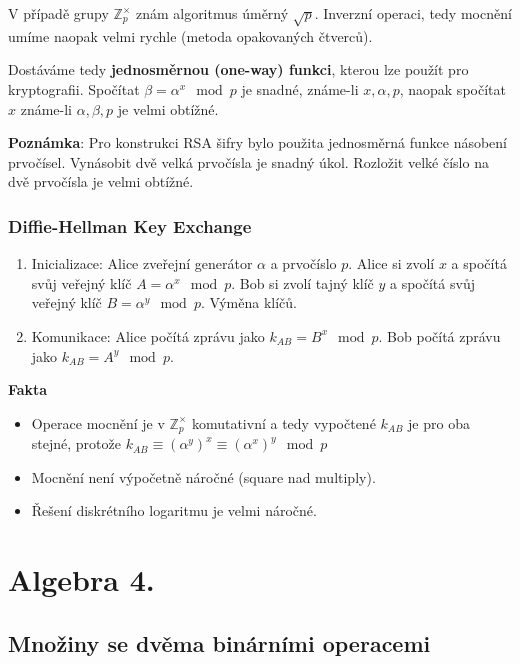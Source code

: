 \documentclass[12pt, letterpaper]{article}
\begin{document}
V případě grupy $\mathbb{Z}^\times_p$ znám algoritmus úměrný $\sqrt{p}$.
Inverzní operaci, tedy mocnění umíme naopak velmi rychle (metoda opakovaných čtverců).

Dostáváme tedy \textbf{jednosměrnou (one-way) funkci}, kterou lze použít pro kryptografii.
Spočítat $\beta = \alpha^x \mod p$ je snadné, známe-li $x, \alpha, p$,
naopak spočítat $x$ známe-li $\alpha, \beta, p$ je velmi obtížné.

\textbf{Poznámka}: Pro konstrukci RSA šifry bylo použita jednosměrná funkce násobení prvočísel.
Vynásobit dvě velká prvočísla je snadný úkol. Rozložit velké číslo na dvě prvočísla je velmi obtížné.

\subsubsection*{Diffie-Hellman Key Exchange}
\begin{enumerate}
    \item Inicializace:
    \subitem Alice zveřejní generátor $\alpha$ a prvočíslo $p$.
    \subitem Alice si zvolí $x$ a spočítá svůj veřejný klíč $A = \alpha^x \mod p$.
    \subitem Bob si zvolí tajný klíč $y$ a spočítá svůj veřejný klíč $B = \alpha^y \mod p$.
    \subitem Výměna klíčů.
    \item Komunikace:
    \subitem Alice počítá zprávu jako $k_{AB} = B^x \mod p$.
    \subitem Bob počítá zprávu jako $k_{AB} = A^y \mod p$.
\end{enumerate}

\textbf{Fakta}
\begin{itemize}
    \item Operace mocnění je v $\mathbb{Z}^\times_p$ komutativní
     a tedy vypočtené $k_{AB}$ je pro oba stejné, protože $k_{AB} \equiv \left( \alpha^{y} \right)^x \equiv \left( \alpha^{x} \right)^y \mod p$
    \item Mocnění není výpočetně náročné (square nad multiply).
    \item Řešení diskrétního logaritmu je velmi náročné.
\end{itemize}


\section{Algebra 4.}

\subsection{Množiny se dvěma binárními operacemi}
\end{document}
